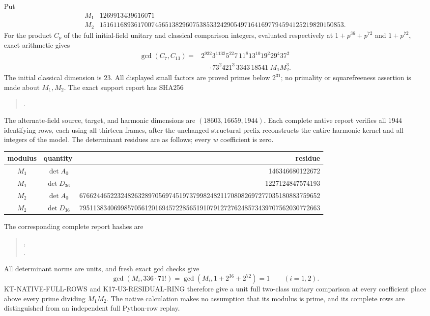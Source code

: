 Put
\[
\begin{array}{c|r}
 M_1&1269913439616071\\
 M_2&15161168936170074565138296075385332429054971641697794594125219820150853.
\end{array}                                                     \tag{KM.1}
\]
For the product $C_p$ of the full initial-field unitary and
classical comparison integers, evaluated respectively at
$1+p^{36}+p^{72}$ and $1+p^{72}$, exact arithmetic gives
\[
\begin{aligned}
 \gcd(C_7,C_{13})
   ={}&2^{932}3^{1132}5^{22}7\,11^8 13^{10}19^2 29^4 37^2\\
     &\quad\cdot73^2 421^3\,3343\,18541\;M_1M_2^3.
\end{aligned}                                                    \tag{KM.2}
\]
The initial classical dimension is $23$.  All displayed
small factors are proved primes below $2^{31}$; no
primality or squarefreeness assertion is made about
$M_1,M_2$.  The exact support report has SHA256
\begin{quote}\small
{}.
\end{quote}

The alternate-field source, target, and harmonic dimensions
are $(18603,16659,1944)$.  Each complete native report
verifies all $1944$ identifying rows, each using all thirteen
frames, after the unchanged structural prefix reconstructs
the entire harmonic kernel and all integers of the model.
The determinant residues are as follows; every $w$
coefficient is zero.
\begin{center}\footnotesize
\begin{tabular}{c|c|r}
modulus&quantity&residue\\\hline
$M_1$&$\det A_0$&146346680122672\\
$M_1$&$\det D_{36}$&1227124847574193\\
$M_2$&$\det A_0$&6766244652232482632897056974519737998248211708082697277035180883759652\\
$M_2$&$\det D_{36}$&7951138340699857056120169457228565191079127276248573439707562030772663
\end{tabular}
\end{center}
The corresponding complete report hashes are
\begin{quote}\small
{},\\
.
\end{quote}
All determinant norms are units, and fresh exact gcd
checks give
\[
 \gcd(M_i,336\cdot71!)=
 \gcd(M_i,1+2^{36}+2^{72})=1\qquad(i=1,2).                  \tag{KM.3}
\]
KT-NATIVE-FULL-ROWS and K17-U3-RESIDUAL-RING therefore
give a unit full two-class unitary comparison at every
coefficient place above every prime dividing $M_1M_2$.
The native calculation makes no assumption that its
modulus is prime, and its complete rows are distinguished
from an independent full Python-row replay.

